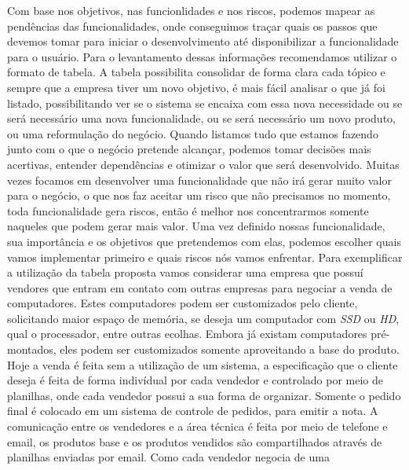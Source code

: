     Com base nos objetivos, nas funcionlidades e nos riscos, podemos mapear as
    pendências das funcionalidades, onde conseguimos traçar quais os passos que
    devemos tomar para iniciar o desenvolvimento até disponibilizar a funcionalidade
    para o usuário. \newline
    Para o levantamento dessas informações recomendamos utilizar o formato de
    tabela. A tabela possibilita consolidar de forma clara cada tópico e sempre
    que a empresa tiver um novo objetivo, é mais fácil analisar o que já foi listado,
    possibilitando ver se o sistema se encaixa com essa nova necessidade ou se será
    necessário uma nova funcionalidade, ou se será necessário um novo produto,
    ou uma reformulação do negócio. Quando listamos tudo que estamos fazendo
    junto com o que o negócio pretende alcançar, podemos tomar decisões mais
    acertivas, entender dependências e otimizar o valor que será desenvolvido.
    Muitas vezes focamos em desenvolver uma funcionalidade que não irá gerar
    muito valor para o negócio, o que nos faz aceitar um risco que não precisamos
    no momento, toda funcionalidade gera riscos, então é melhor nos concentrarmos
    somente naqueles que podem gerar mais valor. \newline
    Uma vez definido nossas funcionalidade, sua importância e os objetivos que
    pretendemos com elas, podemos escolher quais vamos implementar primeiro e
    quais riscos nós vamos enfrentar. \newline
    Para exemplificar a utilização da tabela proposta vamos considerar uma
    empresa que possuí vendores que entram em contato com outras empresas para
    negociar a venda de computadores. Estes computadores podem ser customizados
    pelo cliente, solicitando maior espaço de memória, se deseja um computador
    com \textit{SSD} ou \textit{HD}, qual o processador, entre outras ecolhas.
    Embora já existam computadores pré-montados, eles podem ser customizados
    somente aproveitando a base do produto. \newline
    Hoje a venda é feita sem a utilização de um sistema, a especificação que o
    cliente deseja é feita de forma indivídual por cada vendedor e controlado por
    meio de planilhas, onde cada vendedor possui a sua forma de organizar. Somente
    o pedido final é colocado em um sistema de controle de pedidos, para emitir a
    nota. A comunicação entre os vendedores e a área técnica é feita por meio de
    telefone e email, os produtos base e os produtos vendidos são compartilhados
    através de planilhas enviadas por email. Como cada vendedor negocia de uma
